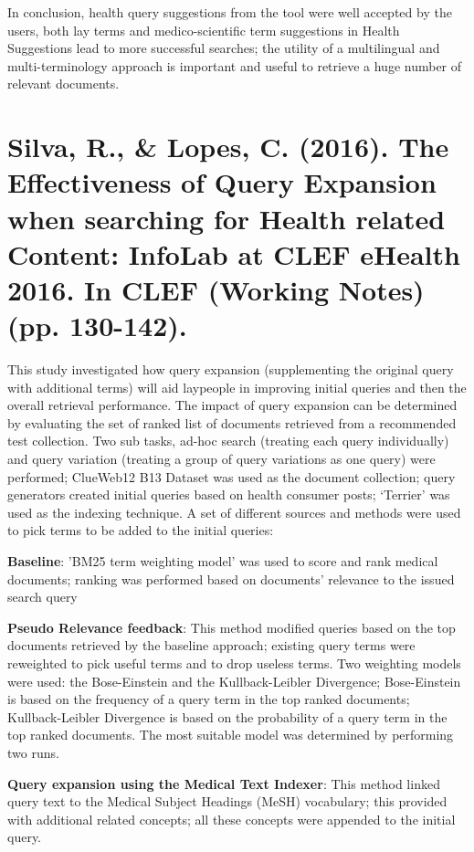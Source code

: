 \documentclass[]{article}
\begin{document}
In conclusion, health query suggestions from the tool were well accepted by the users, both lay terms and medico-scientific term suggestions in Health Suggestions lead to more successful searches; the utility of a multilingual and multi-terminology approach is important and useful to retrieve a huge number of relevant documents.     

\section{Silva, R., \& Lopes, C. (2016). The Effectiveness of Query Expansion when searching for Health related Content: InfoLab at CLEF eHealth 2016. In CLEF (Working Notes) (pp. 130-142).}

This study investigated how query expansion (supplementing the original query with additional terms) will aid laypeople in improving initial queries and then the overall retrieval performance. The impact of query expansion can be determined by evaluating the set of ranked list of documents retrieved from a recommended test collection. Two sub tasks, ad-hoc search (treating each query individually) and query variation (treating a group of query variations as one query) were performed; ClueWeb12 B13 Dataset was used as the document collection; query generators created initial queries based on health consumer posts; ‘Terrier’ was used as the indexing technique. A set of different sources and methods were used to pick terms to be added to the initial queries:        

\textbf{Baseline}: 'BM25 term weighting model' was used to score and rank medical documents; ranking was performed based on documents' relevance to the issued search query 

\textbf{Pseudo Relevance feedback}: This method modified queries based on the top documents retrieved by the baseline approach; existing query terms were reweighted to pick useful terms and to drop useless terms. Two weighting models were used: the Bose-Einstein and the Kullback-Leibler Divergence; Bose-Einstein is based on the frequency of a query term in the top ranked documents; Kullback-Leibler Divergence is based on the probability of a query term in the top ranked documents. The most suitable model was determined by performing two runs.             

\textbf{Query expansion using the Medical Text Indexer}: This method linked query text to the Medical Subject Headings (MeSH) vocabulary; this provided with additional related concepts; all these concepts were appended to the initial query.  
\end{document}
